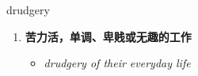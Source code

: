 
\begin{frame}
{\huge drudgery}
\begin{center}
\begin{enumerate}\Large
  \item \textbf{苦力活，单调、卑贱或无趣的工作}
  \begin{itemize}
    \item \em{\Large{drudgery of their everyday life}}
  \end{itemize}
\end{enumerate}
\end{center}
\end{frame}

